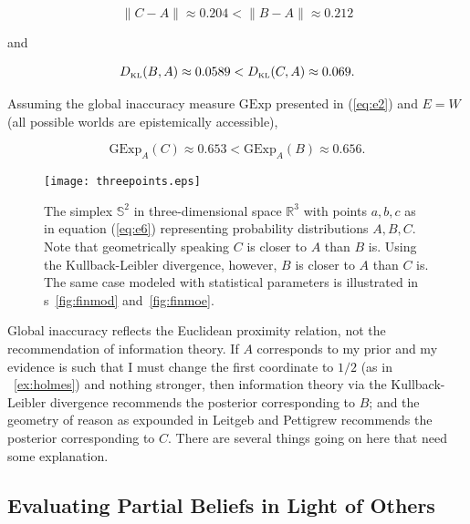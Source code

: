 \documentclass[phd,12pt,oneside]{ubcthesis}
\begin{document}
\begin{equation}
  \label{eq:e8}
  \|C-A\|\approx{}0.204<\|B-A\|\approx{}0.212
\end{equation}

and

\begin{equation}
  \label{eq:e9}
  D_{\mbox{\tiny KL}}(B,A)\approx{}0.0589<D_{\mbox{\tiny KL}}(C,A)\approx{}0.069.
\end{equation}

{\noindent}Assuming the global inaccuracy measure $\mbox{GExp}$
presented in (\ref{eq:e2}) and $E=W$ (all possible worlds are
epistemically accessible),

\begin{equation}
  \label{eq:e8a}
  \mbox{GExp}_{A}(C)\approx{}0.653<\mbox{GExp}_{A}(B)\approx{}0.656.
\end{equation}

\begin{figure}[ht!]
    \begin{minipage}[h]{.7\linewidth}
      \texttt{[image: threepoints.eps]}
      \caption{\footnotesize The simplex $\mathbb{S}^{2}$ in
        three-dimensional space $\mathbb{R}^{3}$ with points $a,b,c$
        as in equation (\ref{eq:e6}) representing probability
        distributions $A,B,C$. Note that geometrically speaking $C$ is
        closer to $A$ than $B$ is. Using the Kullback-Leibler
        divergence, however, $B$ is closer to $A$ than $C$ is. The
        same case modeled with statistical parameters is illustrated
        in {\igure}s~\ref{fig:finmod} and~\ref{fig:finmoe}.}
      \label{fig:threepoints}
    \end{minipage}
\end{figure}

Global inaccuracy reflects the Euclidean proximity relation, not the
re\-commendation of information theory. If $A$ corresponds to my prior
and my evidence is such that I must change the first coordinate to
$1/2$ (as in {\xample}~\ref{ex:holmes}) and nothing stronger, then
information theory via the Kullback-Leibler divergence re\-commends
the posterior corresponding to $B$; and the geometry of reason as
expounded in Leitgeb and Pettigrew recommends the posterior
corresponding to $C$. There are several things going on here that need
some explanation.

\subsection{Evaluating Partial Beliefs in Light of Others}
\label{subsec:aichavag}
\end{document}

